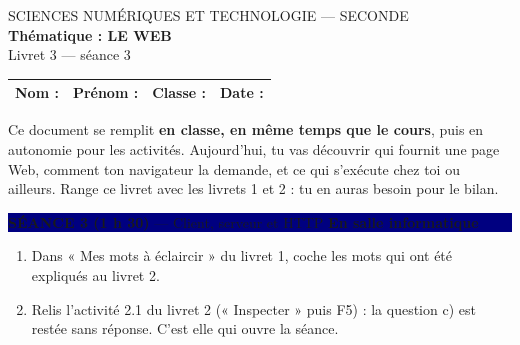 \documentclass[11pt,a4paper]{article}
\newif\ifprof
\newcommand{\seance}[1]{%
  \par\addvspace{6pt}\noindent\colorbox{navy}{\parbox{\dimexpr\linewidth-2\fboxsep}{\color{white}#1}}\par\vspace{4pt}}
\begin{document}
\begin{center}
  {\small SCIENCES NUMÉRIQUES ET TECHNOLOGIE — SECONDE}\\[2pt]
  {\color{navy}\LARGE\bfseries Thématique : LE WEB}\\[2pt]
  {\color{navy}\large Livret 3 — séance 3\ifprof\ — \textcolor{corr}{version professeur}\fi}
\end{center}

\noindent\begin{tabularx}{\linewidth}{|Y|Y|Y|Y|}\hline
\textbf{Nom :} & \textbf{Prénom :} & \textbf{Classe :} & \textbf{Date :}\\\hline
\end{tabularx}

\medskip
Ce document se remplit \textbf{en classe, en même temps que le cours}, puis en autonomie pour les activités.
Aujourd'hui, tu vas découvrir qui fournit une page Web, comment ton navigateur la demande, et ce qui s'exécute chez toi ou ailleurs.
Range ce livret avec les livrets 1 et 2 : tu en auras besoin pour le bilan.

\seance{\textbf{SÉANCE 3 (1 h 30)} — Client, serveur et HTTP \hfill \textbf{En salle informatique}}

\begin{tcolorbox}[enhanced,colback=white,colframe=navy!60,boxrule=0.5pt,arc=2pt,left=5pt,right=5pt,top=4pt,bottom=4pt,
  title={\textbf{Avant de commencer}}, coltitle=navy, colbacktitle=bleuclair, fonttitle=\normalsize]
\begin{enumerate}[leftmargin=*,label=\textbf{\arabic*.}]
\item Dans « Mes mots à éclaircir » du livret 1, coche les mots qui ont été expliqués au livret 2.
\item Relis l'activité 2.1 du livret 2 (« Inspecter » puis F5) : la question c) est restée sans réponse. C'est elle qui ouvre la séance.
\end{enumerate}
\end{tcolorbox}
\end{document}
